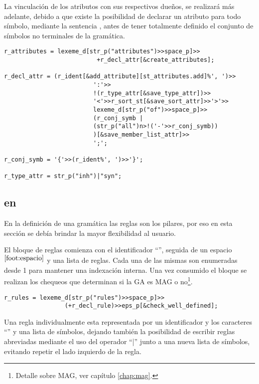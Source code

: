 La vinculación de los atributos con sus respectivos dueños, se realizará más adelante, debido a que existe la posibilidad de declarar un atributo para todo símbolo, mediante la sentencia , antes de tener totalmente definido el conjunto de símbolos no terminales de la gramática.

\begin{lstlisting}[columns=fullflexible, linewidth=12cm]
r_attributes = lexeme_d[str_p("attributes")>>space_p]>>
                          +r_decl_attr[&create_attributes];

r_decl_attr = (r_ident[&add_attribute][st_attributes.add]%', ')>>
                         ':'>>
                         !(r_type_attr[&save_type_attr])>>
                         '<'>>r_sort_st[&save_sort_attr]>>'>'>>
                         lexeme_d[str_p("of")>>space_p]>>
                         (r_conj_symb |
                         (str_p("all")n>!('-'>>r_conj_symb))
                         )[&save_member_list_attr]>>
                         ';';

r_conj_symb = '{'>>(r_ident%', ')>>'}';

r_type_attr = str_p("inh")|"syn";
\end{lstlisting}

\subsection{ en \spirit}

En la definición de una gramática las reglas son los pilares, por eso en esta sección se debía brindar la mayor flexibilidad al usuario.

El bloque de reglas comienza con el identificador ``'', seguida de un espacio$^{\ref{foot:espacio}}$ y una lista de reglas. Cada una de las mismas son enumeradas desde 1 para mantener una indexación interna. Una vez consumido el bloque se realizan los chequeos que determinan si la GA es MAG o no\footnote{Detalle sobre MAG, ver capítulo \ref{chap:mag}.}.

\begin{lstlisting}[columns=fullflexible, linewidth=10cm]
r_rules = lexeme_d[str_p("rules")>>space_p]>>
                 (+r_decl_rule)>>eps_p[&check_well_defined];
\end{lstlisting}

Una regla individualmente esta representada por un identificador y los caracteres ``\textbtt{::=}'' y una lista de símbolos, dejando también la posibilidad de escribir reglas abreviadas mediante el uso del operador ``|'' junto a una nueva lista de símbolos, evitando repetir el lado izquierdo de la regla.

